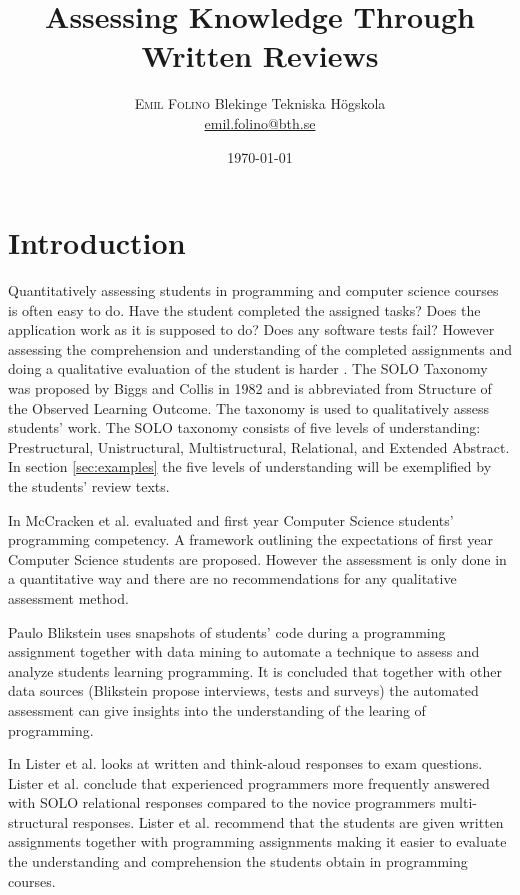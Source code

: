 \documentclass[twoside,twocolumn,a4paper,11pt,english]{article}
\title{Assessing Knowledge Through Written Reviews} %
\author{%
\textsc{Emil Folino} %
\normalsize Blekinge Tekniska Högskola \\ %
\normalsize \href{mailto:emil.folino@bth.se}{emil.folino@bth.se} %
}
\date{\today} %
\begin{document}
\maketitle


\section{Introduction}
Quantitatively assessing students in programming and computer science courses is often easy to do. Have the student completed the assigned tasks? Does the application work as it is supposed to do? Does any software tests fail? However assessing the comprehension and understanding of the completed assignments and doing a qualitative evaluation of the student is harder \cite{biggs1982evaluation}. The SOLO Taxonomy was proposed by Biggs and Collis in 1982 and is abbreviated from Structure of the Observed Learning Outcome. The taxonomy is used to qualitatively assess students' work. The SOLO taxonomy consists of five levels of understanding: Prestructural, Unistructural, Multistructural, Relational, and Extended Abstract. In section \ref{sec:examples} the five levels of understanding will be exemplified by the students' review texts.

In \cite{mccracken2001multi} McCracken et al. evaluated and first year Computer Science students' programming competency. A framework outlining the expectations of first year Computer Science  students are proposed. However the assessment is only done in a quantitative way and there are no recommendations for any qualitative assessment method.

Paulo Blikstein \cite{Blikstein} uses snapshots of students' code during a programming assignment together with data mining to automate a technique to assess and analyze students learning programming. It is concluded that together with other data sources (Blikstein propose interviews, tests and surveys) the automated assessment can give insights into the understanding of the learing of programming.

In \cite{lister2006not} Lister et al. looks at written and think-aloud responses to exam questions. Lister et al. conclude that experienced programmers more frequently answered with SOLO relational responses compared to the novice programmers multi-structural responses. Lister et al. recommend that the students are given written assignments together with programming assignments making it easier to evaluate the understanding and comprehension the students obtain in programming courses.
\end{document}
